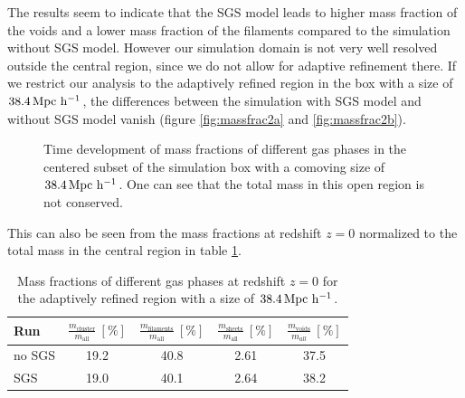 The results seem to indicate that the SGS model leads to higher mass fraction
of the voids and a lower mass fraction of the filaments compared to the
simulation without SGS model. However our simulation domain is not very well
resolved outside the central region, since we do not allow for adaptive
refinement there. If we restrict our analysis to the adaptively refined region
in the box with a size of $\unit[38.4]{Mpc\ h^{-1}}$, the differences between
the simulation with SGS model and without SGS model vanish 
(figure \ref{fig:massfrac2a} and \ref{fig:massfrac2b}).
\begin{figure}[tp]
\centering
{}
\caption{Time development of mass fractions of different gas phases in the
centered subset of the simulation box with a comoving size of 
$\unit[38.4]{Mpc\ h^{-1}}$. One can see that the total mass in this open region
is not conserved.}
\end{figure}
This can also be seen from the mass fractions at redshift $z=0$ normalized to
the total mass in the central region in table \ref{tab:massfrac2}. 
\begin{table}[htbp]
\begin{center}
\begin{tabular}{lcccc}
\hline
Run & 
$\frac{m_{\text{cluster}}}{m_{\text{all}}}\ [\%]$ &
$\frac{m_{\text{filaments}}}{m_{\text{all}}}\ [\%]$ &
$\frac{m_{\text{sheets}}}{m_{\text{all}}}\ [\%]$ & 
$\frac{m_{\text{voids}}}{m_{all}}\ [\%]$ \vspace*{1mm} \\
\hline
\hline
no SGS & 19.2 & 40.8 & 2.61 & 37.5\\ 
SGS & 19.0 & 40.1 & 2.64 & 38.2 \\
\hline
\end{tabular}
\end{center}
\caption{Mass fractions of different gas phases at redshift $z=0$ for the
adaptively refined region with a size of $\unit[38.4]{Mpc\ h^{-1}}$.}
\label{tab:massfrac2}
\end{table}

